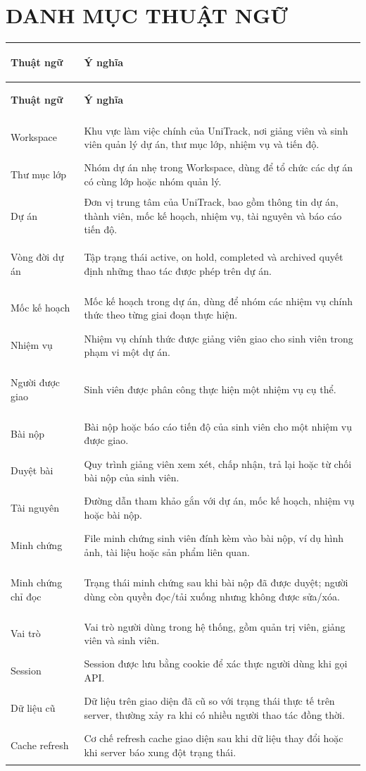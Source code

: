\chapter*{DANH MỤC THUẬT NGỮ}

\begingroup\small
\begin{longtable}{|>{\bfseries\raggedright\arraybackslash}p{}|>{\raggedright\arraybackslash}p{}|}
\hline
\rowcolor{black!7}\textbf{Thuật ngữ} & \textbf{Ý nghĩa} \\
\hline
\endfirsthead
\hline
\rowcolor{black!7}\textbf{Thuật ngữ} & \textbf{Ý nghĩa} \\
\hline
\endhead
Workspace & Khu vực làm việc chính của UniTrack, nơi giảng viên và sinh viên quản lý dự án, thư mục lớp, nhiệm vụ và tiến độ. \\
\hline
Thư mục lớp & Nhóm dự án nhẹ trong Workspace, dùng để tổ chức các dự án có cùng lớp hoặc nhóm quản lý. \\
\hline
Dự án & Đơn vị trung tâm của UniTrack, bao gồm thông tin dự án, thành viên, mốc kế hoạch, nhiệm vụ, tài nguyên và báo cáo tiến độ. \\
\hline
Vòng đời dự án & Tập trạng thái active, on hold, completed và archived quyết định những thao tác được phép trên dự án. \\
\hline
Mốc kế hoạch & Mốc kế hoạch trong dự án, dùng để nhóm các nhiệm vụ chính thức theo từng giai đoạn thực hiện. \\
\hline
Nhiệm vụ & Nhiệm vụ chính thức được giảng viên giao cho sinh viên trong phạm vi một dự án. \\
\hline
Người được giao & Sinh viên được phân công thực hiện một nhiệm vụ cụ thể. \\
\hline
Bài nộp & Bài nộp hoặc báo cáo tiến độ của sinh viên cho một nhiệm vụ được giao. \\
\hline
Duyệt bài & Quy trình giảng viên xem xét, chấp nhận, trả lại hoặc từ chối bài nộp của sinh viên. \\
\hline
Tài nguyên & Đường dẫn tham khảo gắn với dự án, mốc kế hoạch, nhiệm vụ hoặc bài nộp. \\
\hline
Minh chứng & File minh chứng sinh viên đính kèm vào bài nộp, ví dụ hình ảnh, tài liệu hoặc sản phẩm liên quan. \\
\hline
Minh chứng chỉ đọc & Trạng thái minh chứng sau khi bài nộp đã được duyệt; người dùng còn quyền đọc/tải xuống nhưng không được sửa/xóa. \\
\hline
Vai trò & Vai trò người dùng trong hệ thống, gồm quản trị viên, giảng viên và sinh viên. \\
\hline
Session & Session được lưu bằng cookie để xác thực người dùng khi gọi API. \\
\hline
Dữ liệu cũ & Dữ liệu trên giao diện đã cũ so với trạng thái thực tế trên server, thường xảy ra khi có nhiều người thao tác đồng thời. \\
\hline
Cache refresh & Cơ chế refresh cache giao diện sau khi dữ liệu thay đổi hoặc khi server báo xung đột trạng thái. \\
\hline
\end{longtable}
\endgroup
